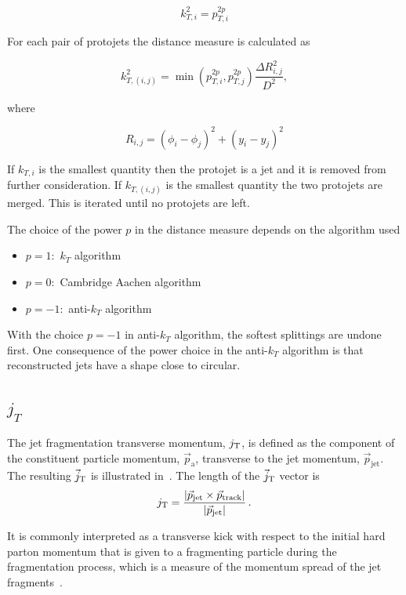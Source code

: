 $$k_{T,i}^2=p_{T,i}^{2p}$$

For each pair of protojets the distance measure is calculated as

$$k_{T,\left(i,j\right)}^{2}=\min\left(p_{T,i}^{2p},p_{T,j}^{2p}\right)\frac{\Delta R^2_{i,j}}
{D^2},$$

where
 
 $$R_{i,j}=\left(\phi_i-\phi_j\right)^2+\left(y_i-y_j\right)^2$$

If $k_{T,i}$ is the smallest quantity then the protojet is a jet and it is removed from further consideration. If $k_{T,\left(i,j\right)}$ is the smallest quantity the two protojets are merged. This is iterated until no protojets are left.

The choice of the power $p$ in the distance measure depends on the algorithm used
\begin{itemize}
\item $p=1$:~$k_T$ algorithm
\item $p=0$:~Cambridge Aachen algorithm
\item $p=-1$:~anti-$k_T$ algorithm
\end{itemize}

With the choice $p=-1$ in anti-$k_T$ algorithm, the softest splittings are undone first. One consequence of the power choice in the anti-$k_T$ algorithm is that reconstructed jets have a shape close to circular.

\subsection{$j_T$ }
The jet fragmentation transverse momentum, $j_{\rm T}$, is defined as the component of the constituent particle momentum, $\vec{p}_{\mathrm{a}}$, transverse to the jet momentum, $\vec{p}_{\mathrm{jet}}$. The resulting $\vec{j}_{\rm T}$ is illustrated in~. The length of the $\vec{j}_{\rm T}$ vector is
  \begin{equation}
    j_{\rm T} = \frac{|\vec{p}_{\mathrm{jet}} \times \vec{p}_{\mathrm{track}}|}{|\vec{p}_{\mathrm{jet}}|} \,.
  \label{eq:jtdefinition}
  \end{equation}

It is commonly interpreted as a transverse kick with respect to the initial hard parton momentum that is given to a fragmenting particle during the fragmentation process, which is a measure of the momentum spread of the jet fragments~\cite{}. 

